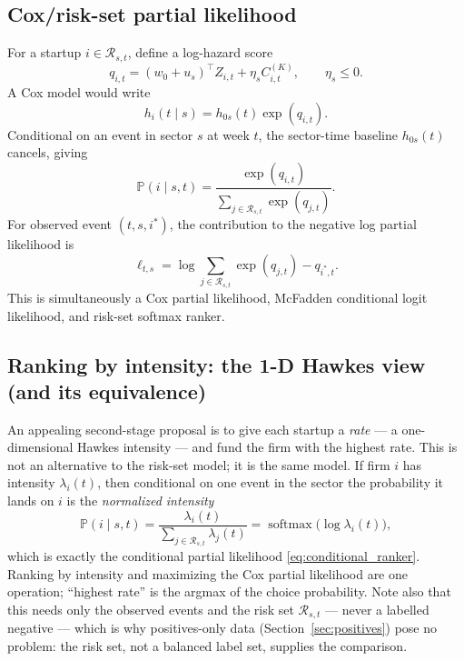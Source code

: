 \documentclass[11pt]{article}
\theoremstyle{plain}
\theoremstyle{definition}
\theoremstyle{remark}
\newcommand{\Prob}{\mathbb{P}}
\newcommand{\cR}{\mathcal{R}}
\DeclareMathOperator{\softmax}{softmax}
\begin{document}
\subsection{Cox/risk-set partial likelihood}
For a startup $i\in\cR_{s,t}$, define a log-hazard score
\begin{equation}
q_{i,t}=(w_0+u_s)^\top Z_{i,t}+\eta_s C^{(K)}_{i,t},\qquad \eta_s\le0.
\label{eq:cox_score}
\end{equation}
A Cox model would write
\begin{equation}
h_i(t\mid s)=h_{0s}(t)\exp(q_{i,t}).
\end{equation}
Conditional on an event in sector $s$ at week $t$, the sector-time baseline $h_{0s}(t)$ cancels, giving
\begin{equation}
\Prob(i\mid s,t)=\frac{\exp(q_{i,t})}{\sum_{j\in\cR_{s,t}}\exp(q_{j,t})}.
\label{eq:conditional_ranker}
\end{equation}
For observed event $(t,s,i^*)$, the contribution to the negative log partial likelihood is
\begin{equation}
\ell_{t,s} = \log\sum_{j\in\cR_{s,t}}\exp(q_{j,t})-q_{i^*,t}.
\label{eq:cox_loss}
\end{equation}
This is simultaneously a Cox partial likelihood, McFadden conditional logit likelihood, and risk-set softmax ranker.

\subsection{Ranking by intensity: the 1-D Hawkes view (and its equivalence)}
\label{sec:intensity_equiv}
An appealing second-stage proposal is to give each startup a \emph{rate} --- a one-dimensional Hawkes intensity --- and fund the firm with the highest rate. This is not an alternative to the risk-set model; it is the same model. If firm $i$ has intensity $\lambda_i(t)$, then conditional on one event in the sector the probability it lands on $i$ is the \emph{normalized intensity}
\begin{equation}
\Prob(i\mid s,t)=\frac{\lambda_i(t)}{\sum_{j\in\cR_{s,t}}\lambda_j(t)}=\softmax\big(\log\lambda_i(t)\big),
\label{eq:intensity_softmax}
\end{equation}
which is exactly the conditional partial likelihood \eqref{eq:conditional_ranker}. Ranking by intensity and maximizing the Cox partial likelihood are one operation; ``highest rate'' is the argmax of the choice probability. Note also that this needs only the observed events and the risk set $\cR_{s,t}$ --- never a labelled negative --- which is why positives-only data (Section~\ref{sec:positives}) pose no problem: the risk set, not a balanced label set, supplies the comparison.
\end{document}
